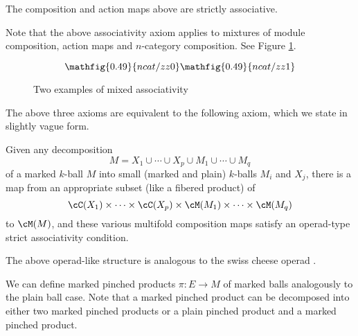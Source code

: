 \begin{module-axiom}
The composition and action maps above are strictly associative.
\end{module-axiom}


Note that the above associativity axiom applies to mixtures of module composition,
action maps and $n$-category composition.
See Figure \ref{zzz1b}.

\begin{figure}[!ht]
\begin{equation*}
\mathfig{0.49}{ncat/zz0} \mathfig{0.49}{ncat/zz1}
\end{equation*}
\caption{Two examples of mixed associativity}
\label{zzz1b}
\end{figure}


The above three axioms are equivalent to the following axiom,
which we state in slightly vague form.

{Given any decomposition 
\[
	M =  X_1 \cup\cdots\cup X_p \cup M_1\cup\cdots\cup M_q
\]
of a marked $k$-ball $M$
into small (marked and plain) $k$-balls $M_i$ and $X_j$, there is a 
map from an appropriate subset (like a fibered product) 
of 
\[
	\cC(X_1)\times\cdots\times\cC(X_p) \times \cM(M_1)\times\cdots\times\cM(M_q) 
\]
to $\cM(M)$,
and these various multifold composition maps satisfy an
operad-type strict associativity condition.}

The above operad-like structure is analogous to the swiss cheese operad
\cite{MR1718089}.

\medskip

We can define marked pinched products $\pi:E\to M$ of marked balls analogously to the 
plain ball case.
Note that a marked pinched product can be decomposed into either
two marked pinched products or a plain pinched product and a marked pinched product.

